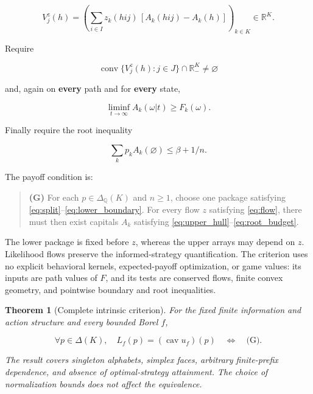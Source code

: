 \documentclass[11pt,a4paper]{article}
\newtheorem{theorem}{Theorem}
\begin{document}
\[
V^z_j(h)=\left(
 \sum_{i\in I}z_k(hij)\,[A_k(hij)-A_k(h)]
 \right)_{k\in K}\in\mathbb R^K.
\]

Require

\begin{equation}
\operatorname{conv}\{V^z_j(h):j\in J\}
 \cap\mathbb R_-^K\ne\varnothing \label{eq:upper_hull}
\end{equation}

and, again on \textbf{every} path and for \textbf{every} state,

\begin{equation}
\liminf_{t\to\infty}A_k(\omega|t)\ge F_k(\omega).
\label{eq:upper_boundary}
\end{equation}

Finally require the root inequality

\begin{equation}
\sum_kp_kA_k(\varnothing)\le\beta+1/n. \label{eq:root_budget}
\end{equation}

The payoff condition is:

\begin{quote}
\textbf{(G)} For each \(p\in\Delta_{\mathbb Q}(K)\) and \(n\ge1\), choose one
package satisfying \eqref{eq:split}--\eqref{eq:lower_boundary}. For every flow
\(z\) satisfying \eqref{eq:flow}, there must then exist capitals \(A_k\)
satisfying \eqref{eq:upper_hull}--\eqref{eq:root_budget}.
\end{quote}

The lower package is fixed before \(z\), whereas the upper arrays may depend
on \(z\). Likelihood flows preserve the informed-strategy quantification.
The criterion uses no explicit behavioral kernels, expected-payoff
optimization, or game values: its inputs are path values of \(F\), and its
tests are conserved flows, finite convex geometry, and pointwise boundary
and root inequalities.

\begin{theorem}[Complete intrinsic criterion]\label{thm:main}
For the fixed finite information and action structure and every bounded Borel \(f\),

\[
\forall p\in\Delta(K),\quad L_f(p)=(\operatorname{cav}u_f)(p)
\quad\Longleftrightarrow\quad \text{(G)}.
\]

The result covers singleton alphabets, simplex faces, arbitrary finite-prefix dependence, and absence of optimal-strategy attainment. The choice of normalization bounds does not affect the equivalence.
\end{theorem}
\end{document}
